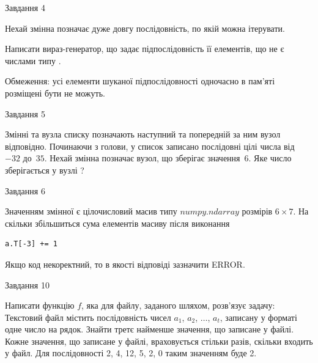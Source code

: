 \documentclass[12pt, ukrainian]{article}
\begin{document}
{               
{\begin{center}Завдання {4}\end{center}}
\vspace{-6mm}
Нехай змінна  позначає дуже довгу послідовність, по якій можна ітерувати.

Написати вираз-генератор, що задає підпослідовність її елементів, що не є числами типу .

Обмеження: усі елементи шуканої підпослідовності одночасно в пам'яті розміщені бути не можуть.\par

\vspace{10mm}
               
{\begin{center}Завдання {5}\end{center}}
\vspace{-6mm}
Змінні  та  вузла списку позначають наступний та попередній за ним вузол відповідно. Починаючи з голови, у список записано послідовні цілі числа від~$-32$ до~$35$. Нехай змінна  позначає вузол, що зберігає значення~$6$.
Яке число зберігається у вузлі  ?\par

               
{\begin{center}Завдання {6}\end{center}}
\vspace{-6mm}
Значенням змінної  є цілочисловий масив типу $numpy.ndarray$ розмірів $6{\times}7$. На скільки збільшиться сума елементів масиву  після виконання
\begin{verbatim}
a.T[-3] += 1
\end{verbatim}


Якщо код некоректний, то в якості відповіді зазначити ERROR.\par

               
{\begin{center}Завдання {10}\end{center}}
\vspace{-6mm}

Написати функцію $f$, яка для файлу, заданого шляхом, розв’язує задачу:\\ Текстовий файл містить послідовність чисел $a_1$, $a_2$, $\ldots$, $a_t$, записану у форматі одне число на рядок. Знайти третє найменше значення, що записане у файлі. Кожне значення, що записане у файлі, враховується стільки разів, скільки входить у файл. Для послідовності 2, 4, 12, 5, 2, 0 таким значенням буде 2.

}
\end{document}
